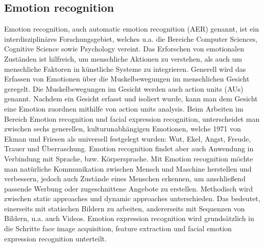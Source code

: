 \subsection{Emotion recognition}
Emotion recognition, auch automatic emotion recognition (AER) genannt, ist ein interdisziplinäres Forschungsgebiet, welches u.a. die Bereiche Computer Sciences, Cognitive Science sowie Psychology vereint. Das Erforschen von emotionalen Zuständen ist hilfreich, um menschliche Aktionen zu verstehen, als auch um menschliche Faktoren in künstliche Systeme zu integrieren.\cite{eyetrackemotionrec}
Generell wird das Erfassen von Emotionen über die Muskelbewegungen im menschlichen Gesicht geregelt. Die Muskelbewegungen im Gesicht werden auch action units (AUs) genannt. Nachdem ein Gesicht erfasst und isoliert wurde, kann man dem Gesicht eine Emotion zuordnen mithilfe von action units analysis.\cite{wildemotionrec}
Beim Arbeiten im Bereich Emotion recognition und facial expression recognition, unterscheidet man zwischen sechs generellen, kulturunabhängigen Emotionen, welche 1971 von Ekman und Friesen als universell festgelegt wurden: Wut, Ekel, Angst, Freude, Trauer und Überraschung.\cite{cnnemotionrec}
Emotion recognition findet aber auch Anwendung in Verbindung mit Sprache, bzw. Körpersprache. Mit Emotion recognition möchte man natürliche Kommunikation zwischen Mensch und Maschine herstellen und verbessern, jedoch auch Zustände eines Menschen erkennen, um anschließend passende Werbung oder zugeschnittene Angebote zu erstellen. Methodisch wird zwischen static approaches und dynamic approaches unterschieden. Das bedeutet, einerseits mit statischen Bildern zu arbeiten, andererseits mit Sequenzen von Bildern, u.a. auch Videos. Emotion expression recognition wird grundsätzlich in die Schritte face image acquisition, feature extraction und facial emotion expression recognition unterteilt. \cite{facialemotionrecusingcnn}
\\

